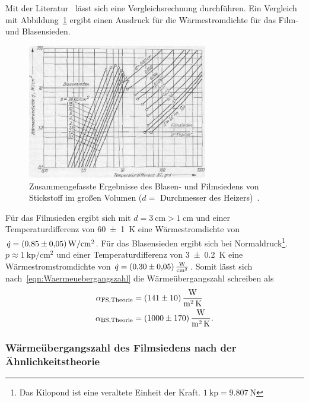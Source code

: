 \documentclass[parskip=half, a4paper,twoside,final]{article}
\begin{document}
Mit der Literatur~\cite{Fastowski} lässt sich eine Vergleichsrechnung durchführen. Ein Vergleich mit Abbildung~\ref{fig:Sieden_Stickstoff} ergibt einen Ausdruck für die Wärmestromdichte für das Film- und Blasensieden.
\begin{figure}[htp]
  \centering
  \includegraphics[width=0.7\textwidth]{Bilder/Sieden_Stickstoff.pdf}
  \caption{Zusammengefasste Ergebnisse des Blasen- und Filmsiedens von Stickstoff im großen Volumen ($d=$ Durchmesser des Heizers)~\cite[S.230]{Fastowski}.}
  \label{fig:Sieden_Stickstoff}
\end{figure}

Für das Filmsieden ergibt sich mit $d = \SI{3}{\centi\metre} > \SI{1}{\centi\metre}$ und einer Temperaturdifferenz von  \SI{60\pm 1}{\kelvin} eine Wärmestromdichte von $\dot{q} = \SI[per-mode=symbol]{0.85\pm 0.05}{\watt\per\centi\metre\squared}$. Für das Blasensieden ergibt sich bei Normaldruck\footnote{Das Kilopond ist eine veraltete Einheit der Kraft. $\SI{1}{\kilo\text{p}} = \SI{9.807}{\newton}$}. $p \approx \SI{1}{\kilo\text{p}\per\centi\metre\squared}$ und einer Temperaturdifferenz von \SI{3\pm 0.2}{\kelvin} eine Wärmestromstromdichte von $\dot{q}= \SI{0.3 \pm 0.05}{\watt\per\centi\metre\squared}$. Somit lässt sich nach~\eqref{eqn:Waermeuebergangszahl} die Wärmeübergangszahl schreiben als
\begin{align}
  \alpha_\text{FS,Theorie} &=
  \SI{141\pm 10}{\watt\per\square\metre\per\kelvin}\\
  \alpha_\text{BS,Theorie} &=
  \SI{1000\pm 170}{\watt\per\square\metre\per\kelvin}.
\end{align}

\subsubsection{Wärmeübergangszahl des Filmsiedens nach der Ähnlichkeitstheorie}
\end{document}
